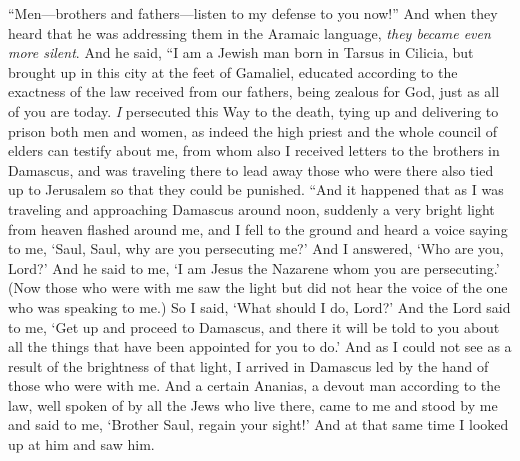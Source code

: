 \begin{biblechapter} %
\verse “Men—brothers and fathers—listen to my defense to you now!”
\verse And when they heard that he was addressing them in the Aramaic language, \textit{they became even more silent}. And he said,
\verse “I am a Jewish man born in Tarsus in Cilicia, but brought up in this city at the feet of Gamaliel, educated according to the exactness of the law received from our fathers, being zealous for God, just as all of you are today.
\verse \textit{I} persecuted this Way to the death, tying up and delivering to prison both men and women,
\verse as indeed the high priest and the whole council of elders can testify about me, from whom also I received letters to the brothers in Damascus, and was traveling there to lead away those who were there also tied up to Jerusalem so that they could be punished.
 “And it happened that as I was traveling and approaching Damascus around noon, suddenly a very bright light from heaven flashed around me,
\verse and I fell to the ground and heard a voice saying to me, ‘Saul, Saul, why are you persecuting me?’
\verse And I answered, ‘Who are you, Lord?’ And he said to me, ‘I am Jesus the Nazarene whom you are persecuting.’
\verse (Now those who were with me saw the light but did not hear the voice of the one who was speaking to me.)
\verse So I said, ‘What should I do, Lord?’ And the Lord said to me, ‘Get up and proceed to Damascus, and there it will be told to you about all the things that have been appointed for you to do.’
\verse And as I could not see as a result of the brightness of that light, I arrived in Damascus led by the hand of those who were with me.
\verse And a certain Ananias, a devout man according to the law, well spoken of by all the Jews who live there,
\verse came to me and stood by me and said to me, ‘Brother Saul, regain your sight!’ And at that same time I looked up at him and saw him.

\end{biblechapter}
